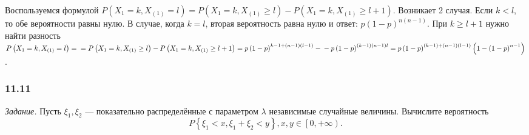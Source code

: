 Воспользуемся формулой
$P \left( X_1 = k, X_{ \left( 1 \right) } = l \right) =
P \left( X_1 = k, X_{ \left( 1 \right) } \geq l \right) - P \left( X_1 = k, X_{ \left( 1 \right) } \geq l + 1 \right) $.
Возникает 2 случая.
Если $k < l$, то обе вероятности равны нулю.
В случае, когда $k = l$, вторая вероятность равна нулю и ответ: $p \left( 1-p \right)^{n \left( n-1 \right) }$.
При $k \geq l + 1$ нужно найти разность
$P \left( X_1 = k, X_{ \left( 1 \right) } = l \right) = \\
= P \left( X_1 = k, X_{ \left( 1 \right) } \geq l \right) - P \left( X_1 = k, X_{ \left( 1 \right) } \geq l + 1 \right) =
p \left( 1-p \right)^{k-1 + \left( n-1 \right) \left( l-1 \right) } - \\
- p \left( 1-p \right)^{ \left( k-1 \right) \left( n-1 \right) l} =
p \left( 1-p \right)^{ \left( k-1 \right) + \left( n-1 \right) \left( l-1 \right) } \left( 1- \left( 1-p \right)^{n-1} \right)$.

\subsubsection*{11.11}

\textit{Задание.} Пусть $ \xi_1, \xi_2$ --- показательно распределённые с параметром $ \lambda $ независимые случайные величины.
Вычислите вероятность
$$P \left\{ \xi_1 < x, \xi_1 + \xi_2 < y \right\},
x, y \in \left[ 0, + \infty \right).$$


